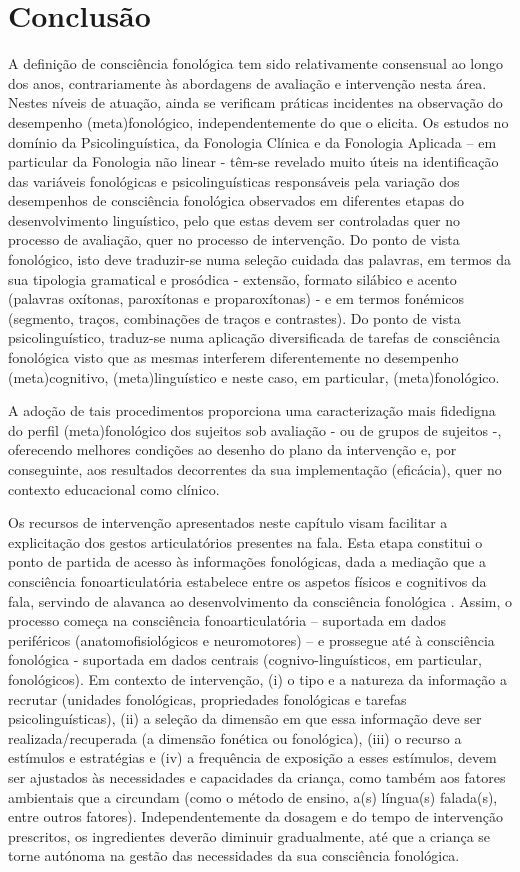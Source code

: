 \documentclass[output=paper,colorlinks,citecolor=brown,booklanguage=portuguese]{langscibook}
\begin{document}
\section{Conclusão}
A definição de consciência fonológica tem sido relativamente consensual ao longo dos anos, contrariamente às abordagens de avaliação e intervenção nesta área. Nestes níveis de atuação, ainda se verificam práticas incidentes na observação do desempenho (meta)fonológico, independentemente do que o elicita. Os estudos no domínio da Psicolinguística, da Fonologia Clínica e da Fonologia Aplicada – em particular da Fonologia não linear - têm-se revelado muito úteis na identificação das variáveis fonológicas e psicolinguísticas responsáveis pela variação dos desempenhos de consciência fonológica observados em diferentes etapas do desenvolvimento linguístico, pelo que estas devem ser controladas quer no processo de avaliação, quer no processo de intervenção. Do ponto de vista fonológico, isto deve traduzir-se numa seleção cuidada das palavras, em termos da sua tipologia gramatical e prosódica - extensão, formato silábico e acento (palavras oxítonas, paroxítonas e proparoxítonas) - e em termos fonémicos (segmento, traços, combinações de traços e contrastes). Do ponto de vista psicolinguístico, traduz-se numa aplicação diversificada de tarefas de consciência fonológica visto que as mesmas interferem diferentemente no desempenho (meta)cognitivo, (meta)linguístico e neste caso, em particular, (meta)fonológico. 

A adoção de tais procedimentos proporciona uma caracterização mais fidedigna do perfil (meta)fonológico dos sujeitos sob avaliação - ou de grupos de sujeitos -, oferecendo melhores condições ao desenho do plano da intervenção e, por conseguinte, aos resultados decorrentes da sua implementação (eficácia), quer no contexto educacional como clínico.

Os recursos de intervenção apresentados neste capítulo visam facilitar a explicitação dos gestos articulatórios presentes na fala. Esta etapa constitui o ponto de partida de acesso às informações fonológicas, dada a mediação que a consciência fonoarticulatória estabelece entre os aspetos físicos e cognitivos da fala, servindo de alavanca ao desenvolvimento da consciência fonológica \citep{VidorSouza2009}. Assim, o processo começa na consciência fonoarticulatória – suportada em dados periféricos (anatomofisiológicos e neuromotores) – e prossegue até à consciência fonológica - suportada em dados centrais (cognivo-linguísticos, em particular, fonológicos). Em contexto de intervenção, (i) o tipo e a natureza da informação a recrutar (unidades fonológicas, propriedades fonológicas e tarefas psicolinguísticas), (ii) a seleção da dimensão em que essa informação deve ser realizada/recuperada (a dimensão fonética ou fonológica), (iii) o recurso a estímulos e estratégias e (iv) a frequência de exposição a esses estímulos, devem ser ajustados às necessidades e capacidades da criança, como também aos fatores ambientais que a circundam (como o método de ensino, a(s) língua(s) falada(s), entre outros fatores). Independentemente da dosagem e do tempo de intervenção prescritos, os ingredientes deverão diminuir gradualmente, até que a criança se torne autónoma na gestão das necessidades da sua consciência fonológica.


{\sloppy\printbibliography[heading=subbibliography,notkeyword=this]}
\end{document}
